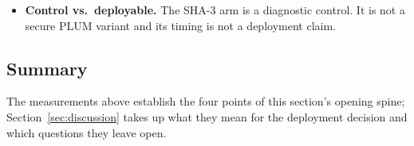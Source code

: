 \begin{itemize}
  \item \textbf{Control vs.\ deployable.} The SHA-3 arm is a diagnostic control. It is not a secure PLUM variant and its timing is not a deployment claim.
\end{itemize}

\subsection{Summary}\label{ssec:eval-summary}
The measurements above establish the four points of this section's opening spine; Section~\ref{sec:discussion} takes up what they mean for the deployment decision and which questions they leave open.

